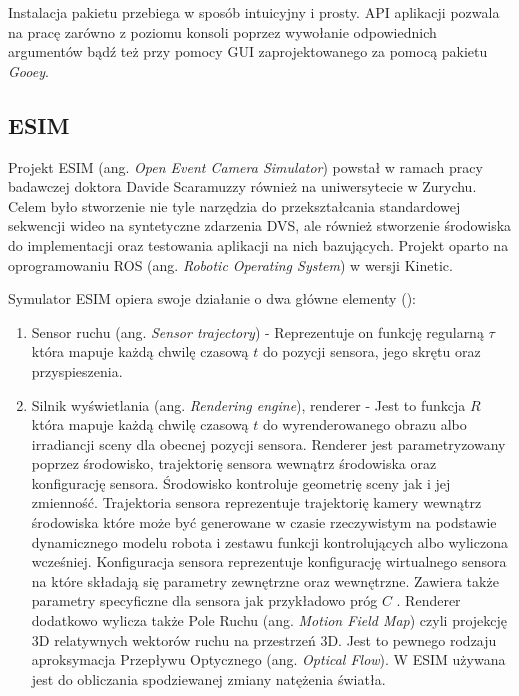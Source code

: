    Instalacja pakietu przebiega w sposób intuicyjny i prosty. API aplikacji pozwala na pracę zarówno z poziomu konsoli poprzez wywołanie odpowiednich argumentów bądź też przy pomocy GUI zaprojektowanego za pomocą pakietu \emph{Gooey}.
   
   
    
    \subsection{ESIM}
    \label{subsec:esim}
    Projekt ESIM (ang. \emph{Open Event Camera Simulator}) powstał w ramach pracy badawczej doktora Davide Scaramuzzy również na uniwersytecie w Zurychu. Celem było stworzenie nie tyle narzędzia do przekształcania standardowej sekwencji wideo na syntetyczne zdarzenia DVS, ale również stworzenie środowiska do implementacji oraz testowania aplikacji na nich bazujących. Projekt oparto na oprogramowaniu ROS (ang. \emph{Robotic Operating System}) w wersji Kinetic.
    
    Symulator ESIM opiera swoje działanie o dwa główne elementy (\cite{ESIM}):
    
    \begin{enumerate}
        \item Sensor ruchu (ang. \emph{Sensor trajectory}) - Reprezentuje on funkcję regularną \(\tau \) która mapuje każdą chwilę czasową \(t \) do pozycji sensora, jego skrętu oraz przyspieszenia.
        
        \item Silnik wyświetlania (ang. \emph{Rendering engine}), renderer - Jest to funkcja  \( R\) która mapuje każdą chwilę czasową \(t\) do wyrenderowanego obrazu albo irradiancji sceny dla obecnej pozycji sensora. Renderer jest parametryzowany poprzez środowisko, trajektorię sensora wewnątrz środowiska oraz konfigurację sensora. Środowisko kontroluje geometrię sceny jak i jej zmienność. Trajektoria sensora reprezentuje trajektorię kamery wewnątrz środowiska które może być generowane w czasie rzeczywistym na podstawie dynamicznego modelu robota i zestawu funkcji kontrolujących albo wyliczona wcześniej. Konfiguracja sensora reprezentuje konfigurację wirtualnego sensora na które składają się parametry zewnętrzne oraz wewnętrzne. Zawiera także parametry specyficzne dla sensora jak przykładowo próg \(C\) . Renderer dodatkowo wylicza także Pole Ruchu (ang. \emph{Motion Field Map}) czyli projekcję 3D relatywnych wektorów ruchu na przestrzeń 3D. Jest to pewnego rodzaju aproksymacja Przepływu Optycznego (ang. \emph{Optical Flow}). W ESIM używana jest do obliczania spodziewanej zmiany natężenia światła.
    \end{enumerate}
    
